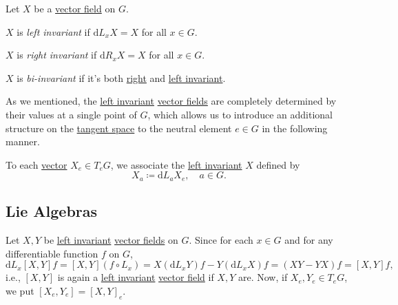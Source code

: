 \begin{definition*}
	Let \(X\) be a \hyperref[def:vector-field]{vector field} on \(G\).

	\begin{definition}\label{def:vector-field-left-invariant}
		\(X\) is \emph{left invariant} if \(\mathrm{d} L_x X = X\) for all \(x\in G\).
	\end{definition}

	\begin{definition}\label{def:vector-field-right-invariant}
		\(X\) is \emph{right invariant} if \(\mathrm{d} R_x X = X\) for all \(x\in G\).
	\end{definition}

	\begin{definition}[Bi-invariant]\label{def:vector-field-bi-invariant}
		\(X\) is \emph{bi-invariant} if it's both \hyperref[def:vector-field-right-invariant]{right} and \hyperref[def:vector-field-left-invariant]{left invariant}.
	\end{definition}
\end{definition*}

As we mentioned, the \hyperref[def:vector-field-left-invariant]{left invariant} \hyperref[def:vector-field]{vector fields} are completely determined by their values at a single point of \(G\), which allows us to introduce an additional structure on the \hyperref[def:tangent-space]{tangent space} to the neutral element \(e\in G\) in the following manner.

To each \hyperref[def:tangent-vector]{vector} \(X_e\in T_e G\), we associate the \hyperref[def:vector-field-left-invariant]{left invariant} \(X\) defined by
\[
	X_a \coloneqq \mathrm{d} L_a X_e,\quad a\in G.
\]

\subsection{Lie Algebras}
Let \(X, Y\) be \hyperref[def:vector-field-left-invariant]{left invariant} \hyperref[def:vector-field]{vector fields} on \(G\). Since for each \(x\in G\) and for any differentiable function \(f\) on \(G\),
\[
	\mathrm{d} L_x [X, Y] f = [X, Y](f \circ L_x) = X(\mathrm{d} L_x Y) f - Y(\mathrm{d} L_x X) f = (XY - YX) f = [X, Y]f,
\]
i.e., \([X, Y]\) is again a \hyperref[def:vector-field-left-invariant]{left invariant} \hyperref[def:vector-field]{vector field} if \(X, Y\) are. Now, if \(X_e, Y_e\in T_e G\), we put \([X_e, Y_e] = [X, Y]_e\).

